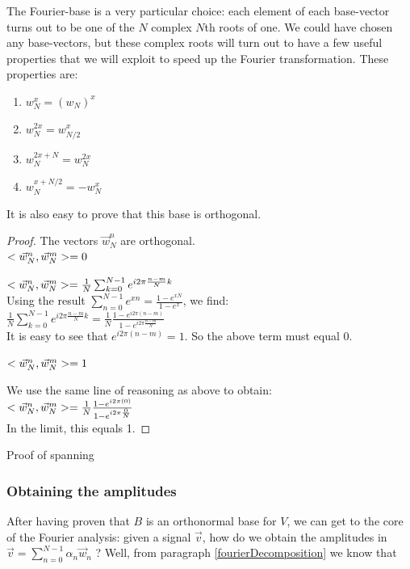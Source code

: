 The Fourier-base is a very particular choice: each element of each base-vector turns out to be one of the $N$ complex $N$th roots of one. We could have chosen any base-vectors, but these complex roots will turn out to have a few useful properties that we will exploit to speed up the Fourier transformation. These properties are:

\begin{enumerate}
    \item $w_N^x = (w_N)^x$
    \item $w_N^{2x} = w_{N/2}^x$
    \item $w_N^{2x+N} = w_N^{2x}$
    \item $w_N^{x+N/2} = - w_N^x$
\end{enumerate}

It is also easy to prove that this base is orthogonal.
\begin{proof} The vectors $\vec{w}_N^n$ are orthogonal. \\
    {$< \vec{w}_N^n , \vec{w}_N^m > = 0$ }{
    
    $< \vec{w}_N^n , \vec{w}_N^m > = \frac{1}{N} \sum_{k=0}^{N-1} e^{i 2\pi \frac{n-m}{N} k} $ \\
    
    Using the result $\sum_{n=0}^{N-1} e^{xn} = \frac{1-e^{xN}}{1-e^{x}}$, we find: \\
    
    $\frac{1}{N} \sum_{k=0}^{N-1} e^{i 2\pi \frac{n-m}{N} k} = \frac{1}{N} \frac{1-e^{i 2\pi (n-m)}}{1-e^{i 2\pi \frac{n-m}{N}}}$ \\
    
    It is easy to see that $e^{i 2\pi (n-m)} = 1$. So the above term must equal 0.
    
    
}
    {$< \vec{w}_N^n , \vec{w}_N^m > = 1$ }{

    We use the same line of reasoning as above to obtain: \\
    
    $ < \vec{w}_N^n , \vec{w}_N^m > = \frac{1}{N} \frac{1-e^{i 2\pi (0)}}{1-e^{i 2\pi \frac{0}{N}}}$ \\
    
    In the limit, this equals 1.
}
\end{proof}


Proof of spanning

\subsubsection{Obtaining the amplitudes}
After having proven that $B$ is an orthonormal base for $V$, we can get to the core of the Fourier analysis: given a signal $\vec{v}$, how do we obtain the amplitudes in $\vec{v} = \sum_{n=0}^{N-1} \alpha_n \vec{w}_n$ ? Well, from paragraph \ref{fourierDecomposition} we know that 

